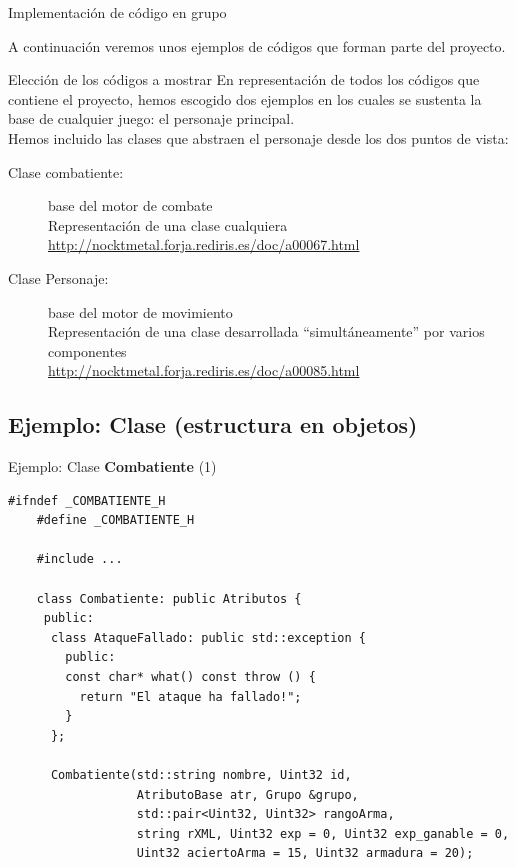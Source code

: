 \documentclass[9pt,xcolor=svgnames]{beamer}
\begin{document}
  \begin{frame}{Implementación de código en grupo}
   \transdissolve

   A continuación veremos unos ejemplos de códigos que forman parte del
   proyecto.

   \begin{block}{Elección de los códigos a mostrar}
    En representación de todos los códigos que contiene el proyecto,
    hemos escogido dos ejemplos en los cuales se sustenta la base de
    cualquier juego: el personaje principal.\\

    \vspace*{0.3cm}    
    Hemos incluido las clases que abstraen el personaje desde los dos
    puntos de vista:
    \begin{description}
     \item[Clase combatiente:] base del motor de combate\\
		Representación de una clase cualquiera\\
		\url{http://nocktmetal.forja.rediris.es/doc/a00067.html}
     \item[Clase Personaje:] base del motor de movimiento\\
		Representación de una clase desarrollada
		``simultáneamente'' por varios componentes\\
		\url{http://nocktmetal.forja.rediris.es/doc/a00085.html}
    \end{description}
   \end{block}
  \end{frame}
 
  \subsection{Ejemplo: Clase (estructura en objetos)}
  
  
  \begin{frame}[fragile=singleslide]{Ejemplo: Clase \textbf{Combatiente} (1)}
   \transdissolve
   
   \begin{lstlisting}[style=C++]
    #ifndef _COMBATIENTE_H
    #define _COMBATIENTE_H
    
    #include ...

    class Combatiente: public Atributos {
     public:
      class AtaqueFallado: public std::exception {
        public:
        const char* what() const throw () {
          return "El ataque ha fallado!";
        }
      };

      Combatiente(std::string nombre, Uint32 id,
                  AtributoBase atr, Grupo &grupo,
                  std::pair<Uint32, Uint32> rangoArma,
                  string rXML, Uint32 exp = 0, Uint32 exp_ganable = 0, 
                  Uint32 aciertoArma = 15, Uint32 armadura = 20);
   \end{lstlisting}
    
  \end{frame}
    
\end{document}
